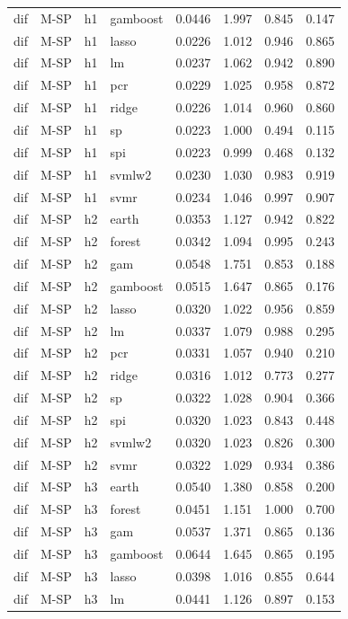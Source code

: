 \begin{ThreePartTable}
\begin{longtable}[t]{llclcccc}
dif & M-SP & h1 & gamboost & 0.0446 & 1.997 & 0.845 & 0.147\\
dif & M-SP & h1 & lasso & 0.0226 & 1.012 & 0.946 & 0.865\\
dif & M-SP & h1 & lm & 0.0237 & 1.062 & 0.942 & 0.890\\
dif & M-SP & h1 & pcr & 0.0229 & 1.025 & 0.958 & 0.872\\
dif & M-SP & h1 & ridge & 0.0226 & 1.014 & 0.960 & 0.860\\
dif & M-SP & h1 & sp & 0.0223 & 1.000 & 0.494 & 0.115\\
dif & M-SP & h1 & spi & 0.0223 & 0.999 & 0.468 & 0.132\\
dif & M-SP & h1 & svmlw2 & 0.0230 & 1.030 & 0.983 & 0.919\\
dif & M-SP & h1 & svmr & 0.0234 & 1.046 & 0.997 & 0.907\\
\addlinespace
dif & M-SP & h2 & earth & 0.0353 & 1.127 & 0.942 & 0.822\\
dif & M-SP & h2 & forest & 0.0342 & 1.094 & 0.995 & 0.243\\
dif & M-SP & h2 & gam & 0.0548 & 1.751 & 0.853 & 0.188\\
dif & M-SP & h2 & gamboost & 0.0515 & 1.647 & 0.865 & 0.176\\
dif & M-SP & h2 & lasso & 0.0320 & 1.022 & 0.956 & 0.859\\
dif & M-SP & h2 & lm & 0.0337 & 1.079 & 0.988 & 0.295\\
dif & M-SP & h2 & pcr & 0.0331 & 1.057 & 0.940 & 0.210\\
dif & M-SP & h2 & ridge & 0.0316 & 1.012 & 0.773 & 0.277\\
dif & M-SP & h2 & sp & 0.0322 & 1.028 & 0.904 & 0.366\\
dif & M-SP & h2 & spi & 0.0320 & 1.023 & 0.843 & 0.448\\
dif & M-SP & h2 & svmlw2 & 0.0320 & 1.023 & 0.826 & 0.300\\
dif & M-SP & h2 & svmr & 0.0322 & 1.029 & 0.934 & 0.386\\
\addlinespace
dif & M-SP & h3 & earth & 0.0540 & 1.380 & 0.858 & 0.200\\
dif & M-SP & h3 & forest & 0.0451 & 1.151 & 1.000 & 0.700\\
dif & M-SP & h3 & gam & 0.0537 & 1.371 & 0.865 & 0.136\\
dif & M-SP & h3 & gamboost & 0.0644 & 1.645 & 0.865 & 0.195\\
dif & M-SP & h3 & lasso & 0.0398 & 1.016 & 0.855 & 0.644\\
dif & M-SP & h3 & lm & 0.0441 & 1.126 & 0.897 & 0.153\\

\end{longtable}
\end{ThreePartTable}
